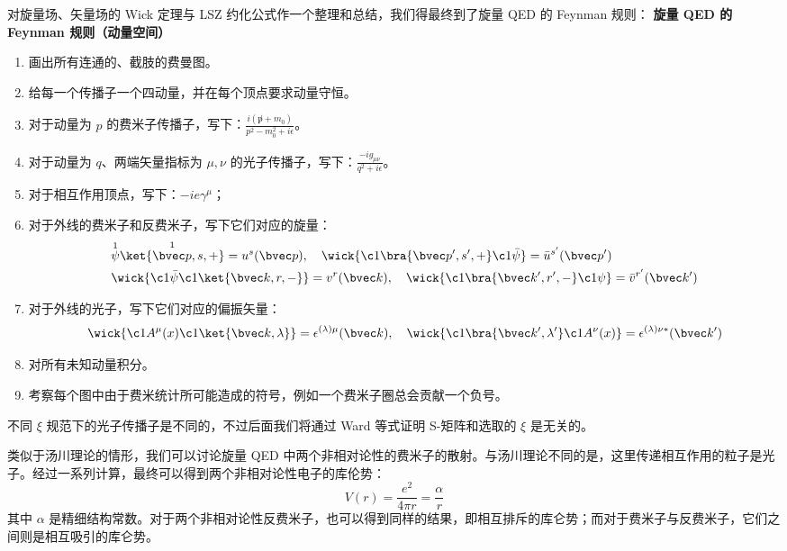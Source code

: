
对旋量场、矢量场的 Wick 定理与 LSZ 约化公式作一个整理和总结，我们得最终到了旋量 QED 的 Feynman 规则：
\textbf{旋量 QED 的 Feynman 规则（动量空间）}
\begin{enumerate}
\item 画出所有连通的、截肢的费曼图。
\item 给每一个传播子一个四动量，并在每个顶点要求动量守恒。
\item 对于动量为 $p$ 的费米子传播子，写下：$\frac{i(\not p+m_0)}{p^2-m_0^2 + i\epsilon}$。
\item 对于动量为 $q$、两端矢量指标为 $\mu,\nu$ 的光子传播子，写下：$\frac{-ig_{\mu\nu}}{q^2 + i\epsilon}$。
\item 对于相互作用顶点，写下：$-ie\gamma^\mu$；
\item 对于外线的费米子和反费米子，写下它们对应的旋量：
\begin{align*}
&\overset{1}{\psi}\overset{1}{\ket{\bvec p,s,+}}=u^s(\bvec p),\quad \wick{\c1{\bra{\bvec p',s',+}} \c1{\bar\psi}}=\bar u^{s'}(\bvec p')\\
&\wick{\c1{\bar\psi}\c1{\ket{\bvec k,r,-}}}=v^{r}(\bvec k),\quad \wick{\c1{\bra{\bvec k',r',-}} \c1\psi}=\bar v^{r'}(\bvec k')
\end{align*}
\item 对于外线的光子，写下它们对应的偏振矢量：
\[
\wick{\c1A^\mu(x) \c1{\ket{\bvec k,\lambda}} }=\epsilon^{(\lambda)\mu}(\bvec k),\quad \wick{\c1{\bra{\bvec k',\lambda'}}\c1A^\nu(x) }=\epsilon^{(\lambda)\nu*}(\bvec k')
\]
\item 
对所有未知动量积分。
\item 
考察每个图中由于费米统计所可能造成的符号，例如一个费米子圈总会贡献一个负号。
\end{enumerate}
不同 $\xi$ 规范下的光子传播子是不同的，不过后面我们将通过 Ward 等式证明 S-矩阵和选取的 $\xi$ 是无关的。

类似于汤川理论的情形，我们可以讨论旋量 QED 中两个非相对论性的费米子的散射。与汤川理论不同的是，这里传递相互作用的粒子是光子。经过一系列计算，最终可以得到两个非相对论性电子的库伦势：
\[
V(r)=\frac{e^2}{4\pi r}=\frac{\alpha}{r}
\]
其中 $\alpha$ 是精细结构常数。对于两个非相对论性反费米子，也可以得到同样的结果，即相互排斥的库仑势；而对于费米子与反费米子，它们之间则是相互吸引的库仑势。
